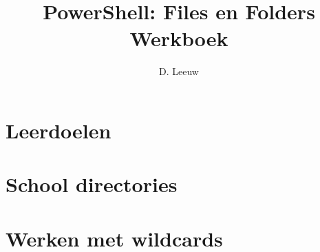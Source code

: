 \documentclass[a4paper,12pt,twoside,titlepage]{article}
\author{D. Leeuw}
\title{PowerShell: Files en Folders Werkboek}
\date{\today\\
0.0.0
\vfill
\raggedright
\copyright\ 2025-2026 Dennis Leeuw\\
}
\begin{document}

\maketitle



\section{Leerdoelen}


\section{School directories}


\section{Werken met wildcards}


\printindex
\end{document}
